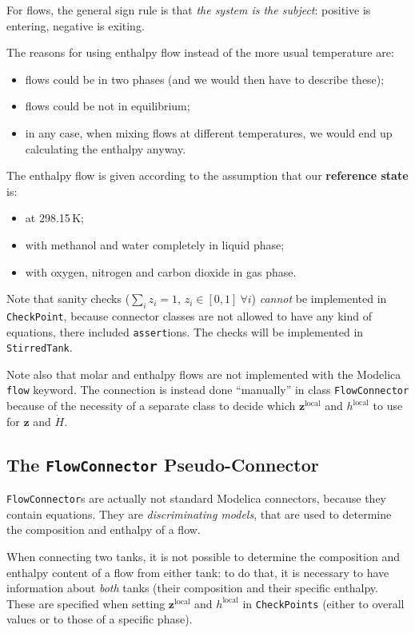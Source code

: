 \documentclass[a4paper]{article}
\begin{document}
For flows, the general sign rule is that \emph{the system is the subject}:
positive is entering, negative is exiting.

The reasons for using enthalpy flow instead of the more usual temperature are:

\begin{itemize}
\item flows could be in two phases (and we would then have to describe these);
\item flows could be not in equilibrium;
\item in any case, when mixing flows at different temperatures, we would end up
calculating the enthalpy anyway.
\end{itemize}

The enthalpy flow is given according to the assumption that our
\textbf{reference state} is:

\begin{itemize}
\item at 298.15\,K;
\item with methanol and water completely in liquid phase;
\item with oxygen, nitrogen and carbon dioxide in gas phase.
\end{itemize}

Note that sanity checks ($\sum_i z_i = 1$, $z_i \in [0,1] ~ \forall i$)
\emph{cannot} be implemented in \texttt{CheckPoint}, because connector classes
are not allowed to have any kind of equations, there included
\texttt{assert}ions. The checks will be implemented in \texttt{StirredTank}.

Note also that molar and enthalpy flows are not implemented with the Modelica
\texttt{flow} keyword. The connection is instead done ``manually'' in class
\texttt{FlowConnector} because of the necessity of a separate class to decide
which $\mathbf{z}^\text{local}$ and $h^\text{local}$ to use for $\mathbf{z}$ and
$\dot H$.


\subsection{The \texttt{FlowConnector} Pseudo-Connector}
\texttt{FlowConnector}s are actually not standard Modelica connectors, because
they contain equations. They are \emph{discriminating models}, that are used to
determine the composition and enthalpy of a flow.

When connecting two tanks, it is not possible to determine the composition and
enthalpy content of a flow from either tank: to do that, it is necessary to have
information about \emph{both} tanks (their composition and their specific
enthalpy. These are specified when setting $\mathbf{z}^\text{local}$ and
$h^\text{local}$ in \texttt{CheckPoints} (either to overall values or to those
of a specific phase).
\end{document}
